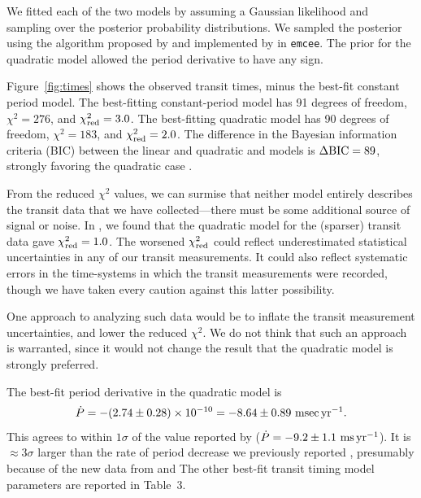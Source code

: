 \documentclass[12pt,twocolumn,tighten]{aastex62}
\begin{document}
We fitted each of the two models by assuming a Gaussian likelihood and
sampling over the posterior probability distributions.  We sampled the
posterior using the algorithm proposed by
\citet{goodman_ensemble_2010} and implemented by
\citet{foreman-mackey_emcee_2013} in \texttt{emcee}.  The prior for
the quadratic model allowed the period derivative to have any sign.

Figure~\ref{fig:times} shows the observed transit times, minus the
best-fit constant period model.  The best-fitting constant-period
model has 91 degrees of freedom, $\chi^2 = 276$,  and $\chi^2_{\rm
red}=3.0$.  The best-fitting quadratic model has 90 degrees of freedom,
$\chi^2 = 183$, and $\chi^2_{\rm red}=2.0$.  The difference in the
Bayesian information criteria (BIC) between the linear and quadratic
and models is $\Delta {\rm BIC} = 89$, strongly favoring the
quadratic case \citep{kass_bayes_1995}.

From the reduced $\chi^2$ values, we can surmise that neither model
entirely describes the transit data that we have collected---there
must be some additional source of signal or noise. In
, we found that the quadratic model for the
(sparser) transit data gave $\chi^2_{\rm red}=1.0$.  The worsened
$\chi^2_{\rm red}$ could reflect underestimated statistical
uncertainties in any of our transit measurements.  It could also
reflect systematic errors in the time-systems in which the transit
measurements were recorded, though we have taken every caution against
this latter possibility.

One approach to analyzing such data would be to inflate the transit
measurement uncertainties, and lower the reduced $\chi^2$.  We do not
think that such an approach is warranted, since it would not change
the result that the quadratic model is strongly preferred.

The best-fit period derivative in the quadratic model is
\begin{equation}
\dot{P}
  = - (2.74 \pm 0.28)\times 10^{-10}
  = - 8.64 \pm 0.89~{\rm msec}\,{\rm yr}^{-1}.
  \label{eq:dP_dt_obs}
\end{equation}
This agrees to within $1\sigma$ of the value reported by
\citet{southworth_transit_2019} ($\dot{P} = - 9.2 \pm 1.1~{\rm
ms}\,{\rm yr}^{-1}$).  It is $\approx$3$\sigma$ larger than the rate
of period decrease we previously reported , presumably because of the
new data from \citeauthor{southworth_transit_2019} and
\citeauthor{baluev_2019}  The other best-fit transit timing model
parameters are reported in Table~3.
\end{document}

